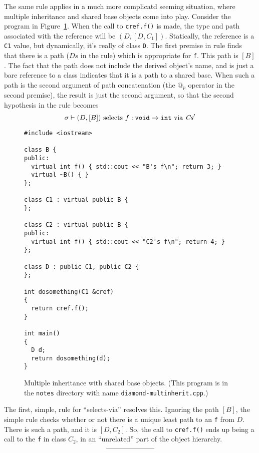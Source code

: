 \documentclass[11pt]{article}
\begin{document}
The same rule applies in a much more complicatd seeming situation,
where multiple inheritance and shared base objects come into play.
Consider the program in Figure~\ref{fig:diamond-cpp}.  When the call
to \texttt{cref.f()} is made, the type and path associated with the
reference will be $(D,[D,C_1])$.  Statically, the reference is a
\texttt{C1} value, but dynamically, it's really of class
\texttt{D}. The first premise in rule 
finds that there is a path ($\mathit{Ds}$ in the rule) which is
appropriate for \texttt{f}.  This path is $[B]$.  The fact that the
path does not include the derived object's name, and is just a bare
reference to a class indicates that it is a path to a shared base.
When such a path is the second argument of path concatenation (the
$@_p$ operator in the second premise), the result is just the second
argument, so that the second hypothesis in the rule becomes
\[
\sigma \vdash (D,[B]) \textrm{ selects } f :
\texttt{void} \rightarrow \texttt{int} \textrm{ via } \mathit{Cs}'
\]
\begin{figure}[hbtp]
\begin{verbatim}
#include <iostream>

class B {
public:
  virtual int f() { std::cout << "B's f\n"; return 3; }
  virtual ~B() { }
};

class C1 : virtual public B {
};

class C2 : virtual public B {
public:
  virtual int f() { std::cout << "C2's f\n"; return 4; }
};

class D : public C1, public C2 {
};

int dosomething(C1 &cref)
{
  return cref.f();
}

int main()
{
  D d;
  return dosomething(d);
}
\end{verbatim}
\caption{Multiple inheritance with shared base objects.  (This program is
in the \texttt{notes} directory with name \texttt{diamond-multinherit.cpp}.)}
\label{fig:diamond-cpp}
\end{figure}

The first, simple, rule for ``selects-via'' resolves this.  Ignoring
the path $[B]$, the simple rule checks whether or not there is a
unique least path to an \texttt{f} from $D$.  There is such a path,
and it is $[D,C_2]$.  So, the call to \texttt{cref.f()} ends up being
a call to the \texttt{f} in class $C_2$, in an ``unrelated'' part of
the object hierarchy.
\[
\rule{0.2\textwidth}{.1mm}
\]
\end{document}
